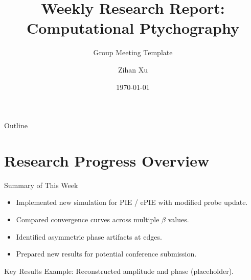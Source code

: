 \documentclass[15pt]{beamer}
\title{Weekly Research Report: Computational Ptychography}
\subtitle{Group Meeting Template}
\author{Zihan Xu}
\date{\today}
\begin{document}
\begin{frame}[plain]
  \titlepage
\end{frame}
\addtocounter{framenumber}{-1}

\begin{frame}[plain]{Outline}
  \tableofcontents[sectionstyle=show, subsectionstyle=hide]
\end{frame}
\addtocounter{framenumber}{-1}

\section{Research Progress Overview}
\begin{frame}{Summary of This Week}
\footnotesize
\begin{itemize}
  \item Implemented new simulation for PIE / ePIE with modified probe update.
  \item Compared convergence curves across multiple $\beta$ values.
  \item Identified asymmetric phase artifacts at edges.
  \item Prepared new results for potential conference submission.
\end{itemize}

\vspace{2mm}
\begin{block}{Key Results}
\centering
{\scriptsize Example: Reconstructed amplitude and phase (placeholder).}
\end{block}
\end{frame}

\end{document}
